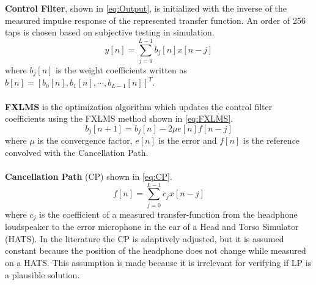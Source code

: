 

\textbf{Control Filter}, shown in \autoref{eq:Output}, is initialized with the inverse of the measured impulse response of the represented transfer function. An order of 256 taps is chosen based on subjective testing in simulation.
\vspace{-3mm} %
\begin{equation}\label{eq:Output}
y[n]=\sum_{j=0}^{L-1}b_j[n]x[n-j]
\end{equation}
where $b_j[n]$ is the weight coefficients written as  $b[n]=[b_0[n],b_1[n], \cdots, b_{L-1}[n]]^T$.
\\\\
\textbf{FXLMS} is the optimization algorithm which updates the control filter coefficients using the FXLMS method shown in \autoref{eq:FXLMS}.
\begin{equation}\label{eq:FXLMS}
b_j[n+1] = b_j[n] - 2\mu e[n]f[n-j]
\end{equation}
where $\mu$ is the convergence factor, $e[n]$ is the error and $f[n]$ is the reference convolved with the Cancellation Path.
\\\\
\textbf{Cancellation Path} (CP) shown in \autoref{eq:CP}.
\begin{equation}\label{eq:CP}
f[n]=\sum_{j=0}^{L-1}c_jx[n-j]
\end{equation}
where $c_j$ is the coefficient of a measured transfer-function from the headphone loudspeaker to the error microphone in the ear of a Head and Torso Simulator (HATS). In the literature \cite{Hansen} the CP is adaptively adjusted, but it is assumed constant because the position of the headphone does not change while measured on a HATS. This assumption is made because it is irrelevant for verifying if LP is a plausible solution. 



